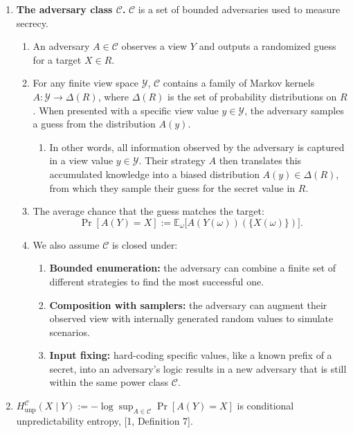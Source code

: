 \documentclass[11pt]{article}
\newcommand{\HunpC}{H_{\mathrm{unp}}^{\mathcal{C}}}
\newcommand{\C}{\mathcal{C}}
\newcommand{\Yspace}{\mathcal{Y}}
\begin{document}
\begin{enumerate}
\item \textbf{The adversary class $\C$.} $\C$ is a set of bounded adversaries used to measure secrecy.
  \begin{enumerate}[label=6.\arabic*.]
  \item An adversary $A \in \C$ observes a view $Y$ and outputs a randomized guess for a target $X \in R$.
  \item For any finite view space $\Yspace$, $\C$ contains a family of Markov kernels $A : \Yspace \to \Delta(R)$, where $\Delta(R)$ is the set of probability distributions on $R$. When presented with a specific view value $y \in \Yspace$, the adversary samples a guess from the distribution $A(y)$.
    \begin{enumerate}[label=6.2.\arabic*.]
    \item In other words, all information observed by the adversary is captured in a view value $y \in \Yspace$. Their strategy $A$ then translates this accumulated knowledge into a biased distribution $A(y) \in \Delta(R)$, from which they sample their guess for the secret value in $R$.
    \end{enumerate}
  \item The average chance that the guess matches the target:
    \[ \Pr[A(Y) = X] := \mathbb{E}_\omega \big[ A(Y(\omega))(\{X(\omega)\}) \big]. \]
  \item We also assume $\C$ is closed under:
    \begin{enumerate}[label=6.4.\arabic*.]
    \item \textbf{Bounded enumeration:} the adversary can combine a finite set of different strategies to find the most successful one.
    \item \textbf{Composition with samplers:} the adversary can augment their observed view with internally generated random values to simulate scenarios.
    \item \textbf{Input fixing:} hard-coding specific values, like a known prefix of a secret, into an adversary's logic results in a new adversary that is still within the same power class $\C$.
    \end{enumerate}
  \end{enumerate}

\item $\HunpC(X \mid Y) := -\log \sup_{A \in \C} \Pr[A(Y) = X]$ is conditional unpredictability entropy, [1, Definition 7].


\end{enumerate}
\end{document}
